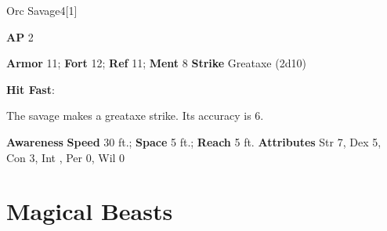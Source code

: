 \begin{monsection}{Orc Savage}{4}[1]
\vspace{-1em}\vspace{-1em}
\begin{spellcontent}
\begin{spelltargetinginfo}
{\textbf{AP} 2}

\pari \textbf{Armor} 11;
\textbf{Fort} 12;
\textbf{Ref} 11;
\textbf{Ment} 8
\pari \textbf{Strike} Greataxe  (2d10)



\end{spelltargetinginfo}


\begin{spelleffects}

\pari
\textbf{Hit Fast}:

The savage makes a greataxe strike.
Its accuracy is 6.




\end{spelleffects}

\end{spellcontent}

\begin{monsterfooter}
\pari \textbf{Awareness} 
\pari \textbf{Speed} 30 ft.;
\textbf{Space} 5 ft.;
\textbf{Reach} 5 ft.
\pari \textbf{Attributes}
Str 7,
Dex 5,
Con 3,
Int ,
Per 0,
Wil 0
\end{monsterfooter}
\end{monsection}


\section{Magical Beasts}

